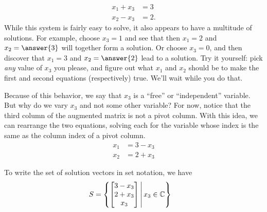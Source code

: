 \documentclass{ximera}
\begin{document}
\begin{example}
\begin{align*}
x_1+x_3&=3\\
x_2-x_3&=2.
\end{align*}
While this system is fairly easy to solve, it also appears to have a multitude of solutions.  For example, choose $x_3=1$ and see that then $x_1=2$ and $x_2=\answer{3}$ will together form a solution.  Or choose $x_3=0$, and then discover that $x_1=3$ and $x_2=\answer{2}$ lead to a solution.  Try it yourself: pick \textit{any} value of $x_3$ you please, and figure out what $x_1$ and $x_2$ should be to make the first and second equations (respectively) true.  We'll wait while you do that.

Because of this behavior, we say that $x_3$ is a ``free'' or ``independent'' variable.  But why do we vary $x_3$ and not some other variable?  For now, notice that the third column of the augmented matrix is not a pivot column.  With this idea, we can rearrange the two equations, solving each for the variable whose index is the same as the column index of a pivot column.
\begin{align*}
x_1&=3-x_3\\
x_2&=2+x_3
\end{align*}

To write the set of solution vectors in set notation, we have
\begin{align*}
S&=\left\lbrace\begin{bmatrix}3-x_3\\2+x_3\\x_3\end{bmatrix}\,\middle|\,x_3\in\mathbb{C}\right\rbrace
\end{align*}
\end{example}
\end{document}
